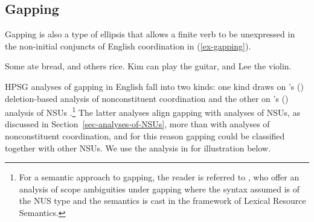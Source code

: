 {%
%
%
%
%

%
%
%
%
%
%
%
%
%
%
%
%
%



\subsection{Gapping}

Gapping is also a type of ellipsis that allows a finite
verb to be unexpressed in the non-initial conjuncts of English coordination in (\ref{ex-gapping}).

\eal
\label{ex-gapping}
\ex Some ate bread, and others rice.\label{g1}
\ex Kim can play the guitar, and Lee the violin.\label{g2}
\zl
%
%
%
%

HPSG analyses of gapping in English fall into two kinds: one kind draws on \citeauthor{Beavers2004}'s (\citeyear{Beavers2004}) deletion-based analysis of nonconstituent coordination \citep{Chaves2009} and the other on \citeauthor{Ginzburg:Sag:2000}'s (\citeyear{Ginzburg:Sag:2000}) analysis of NSUs \citep{Abeille2014}.\footnote{For a semantic approach to gapping, the reader is referred to \citet{Parketal2019}, who offer an analysis of scope ambiguities under gapping where the syntax assumed is of the NUS type and the semantics is cast in the framework of Lexical Resource Semantics.} The latter analyses align gapping with analyses of NSUs, as discussed in Section~\ref{sec-analyses-of-NSUs}, more than with analyses of nonconstituent coordination, and for this reason gapping could be classified together with other NSUs. We use the analysis in \citet{Abeille2014} for illustration below.


}
